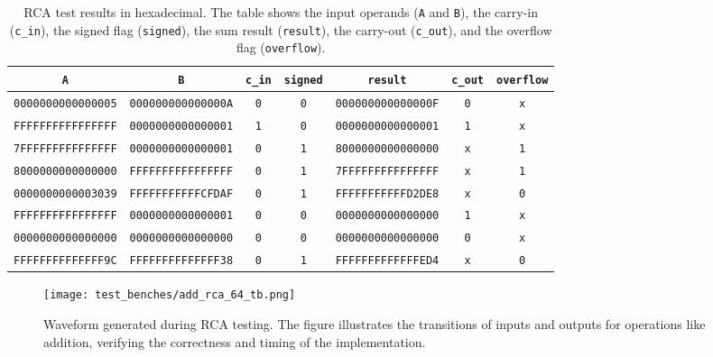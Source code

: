 \documentclass[12pt]{article}
\begin{document}
\begin{table}[ht!]
    \centering
    \renewcommand{\arraystretch}{1.1}
    \setlength{\tabcolsep}{2pt}
    \begin{tabular}{|c|c|c|c|c|c|c|}
        \hline
        \texttt{A} & \texttt{B} & \texttt{c\_in} & \texttt{signed} & \texttt{result} & \texttt{c\_out} & \texttt{overflow} \\
        \hline
        \texttt{0000000000000005} & \texttt{000000000000000A} & \texttt{0} & \texttt{0} & \texttt{000000000000000F} & \texttt{0} & \texttt{x} \\
        \texttt{FFFFFFFFFFFFFFFF} & \texttt{0000000000000001} & \texttt{1} & \texttt{0} & \texttt{0000000000000001} & \texttt{1} & \texttt{x} \\
        \texttt{7FFFFFFFFFFFFFFF} & \texttt{0000000000000001} & \texttt{0} & \texttt{1} & \texttt{8000000000000000} & \texttt{x} & \texttt{1} \\
        \texttt{8000000000000000} & \texttt{FFFFFFFFFFFFFFFF} & \texttt{0} & \texttt{1} & \texttt{7FFFFFFFFFFFFFFF} & \texttt{x} & \texttt{1} \\
        \texttt{0000000000003039} & \texttt{FFFFFFFFFFFCFDAF} & \texttt{0} & \texttt{1} & \texttt{FFFFFFFFFFFD2DE8} & \texttt{x} & \texttt{0} \\
        \texttt{FFFFFFFFFFFFFFFF} & \texttt{0000000000000001} & \texttt{0} & \texttt{0} & \texttt{0000000000000000} & \texttt{1} & \texttt{x} \\
        \texttt{0000000000000000} & \texttt{0000000000000000} & \texttt{0} & \texttt{0} & \texttt{0000000000000000} & \texttt{0} & \texttt{x} \\
        \texttt{FFFFFFFFFFFFFF9C} & \texttt{FFFFFFFFFFFFFF38} & \texttt{0} & \texttt{1} & \texttt{FFFFFFFFFFFFFED4} & \texttt{x} & \texttt{0} \\
        \hline
    \end{tabular}
    \caption{RCA test results in hexadecimal. The table shows the input operands (\texttt{A} and \texttt{B}), the carry-in (\texttt{c\_in}), the signed flag (\texttt{signed}), the sum result (\texttt{result}), the carry-out (\texttt{c\_out}), and the overflow flag (\texttt{overflow}).}
    \label{tab:adder_results}
\end{table}

\begin{figure}[ht!]
    \centering
    \texttt{[image: test\_benches/add\_rca\_64\_tb.png]}
    \caption{Waveform generated during RCA testing. The figure illustrates the transitions of inputs and outputs for operations like addition, verifying the correctness and timing of the implementation.}
    \label{fig:adder_waveform}
\end{figure}
\end{document}
